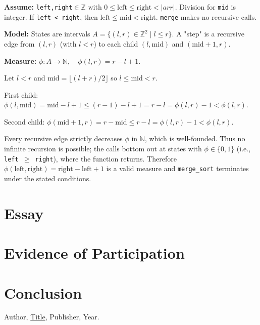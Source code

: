 \documentclass{article}
\theoremstyle{theorem}
\theoremstyle{definition}
\theoremstyle{remark}
\begin{document}
\textbf{Assume:} \texttt{left,right}$\in\mathbb{Z}$ with $0\le \text{left}\le \text{right}<|arr|$. Division for \texttt{mid} is integer. If \texttt{left < right}, then $\text{left}\le \text{mid}<\text{right}$. \texttt{merge} makes no recursive calls.

\textbf{Model:} States are intervals $A=\{(l,r)\in\mathbb Z^2\mid l\le r\}$. A "step" is a recursive edge from $(l,r)$ (with $l<r$) to each child $(l,\text{mid})$ and $(\text{mid}+1,r)$.

\textbf{Measure:} $\phi:A\to\mathbb N,\quad \phi(l,r)=r-l+1$.

Let $l<r$ and $\text{mid}=\lfloor(l+r)/2\rfloor$ so $l\le \text{mid}<r$.

First child: $\phi(l,\text{mid})=\text{mid}-l+1\le (r-1)-l+1=r-l=\phi(l,r)-1<\phi(l,r)$.

Second child: $\phi(\text{mid}+1,r)=r-\text{mid}\le r-l=\phi(l,r)-1<\phi(l,r)$.

Every recursive edge strictly decreases $\phi$ in $\mathbb N$, which is well-founded. Thus no infinite recursion is possible; the calls bottom out at states with $\phi\in\{0,1\}$ (i.e., \texttt{left $\geq$ right}), where the function returns. Therefore $\phi(\text{left},\text{right})=\text{right}-\text{left}+1$ is a valid measure and \texttt{merge\_sort} terminates under the stated conditions.

\section{Essay}

\section{Evidence of Participation}

\section{Conclusion}\label{conclusion}

\begin{thebibliography}{99}
 Author, \href{https://en.wikipedia.org/wiki/LaTeX}{Title}, Publisher, Year.
\end{thebibliography}
\end{document}
